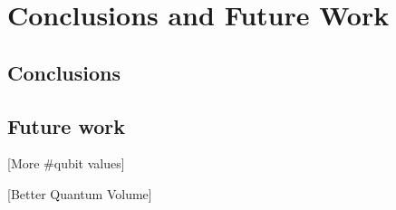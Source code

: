 

\chapter{Conclusions and Future Work}
\label{sec:orgffbb187}
\section{Conclusions}
\label{sec:org7fdc5b3}
\section{Future work}
\label{sec:orged826c1}

[More \#qubit values]

[Better Quantum Volume]
